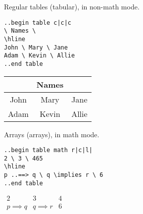 \documentclass[12pt]{article}
\begin{document}
\begin{flushleft}

Regular tables (tabular), in non-math mode.

\verb=..begin table c|c|c= \\
\verb|\ Names \| \\
\verb|\hline| \\
\verb|John \ Mary \ Jane| \\
\verb|Adam \ Kevin \ Allie| \\
\verb|..end table|

\bigskip
\bigskip

\begin{tabular}{c|c|c}
& Names & \\
\hline
John & Mary & Jane \\
Adam & Kevin & Allie 
\end{tabular}

\bigskip
\bigskip
\bigskip
\bigskip

Arrays (arrays), in math mode.

\verb=..begin table math r|c|l|= \\
\verb|2 \ 3 \ 465| \\
\verb|\hline| \\
\verb|p |\verb|..==> q \ q \implies r \ 6| \\
\verb|..end table|

\bigskip
\bigskip

$\begin{array}{r|c|l|}
2 & 3 & 4 \\
\hline
p \implies q & q \implies r & 6 
\end{array}$

\end{flushleft}
\end{document}
